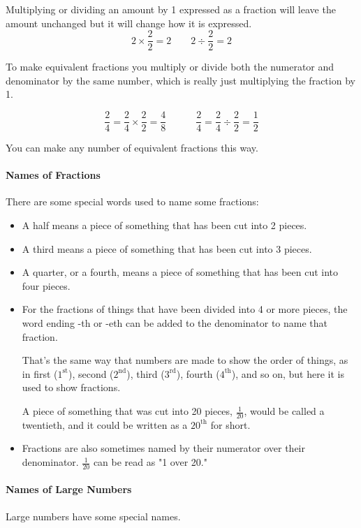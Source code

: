 \documentclass[12pt]{article}
\begin{document}
{Multiplying or dividing an amount by 1 expressed as a fraction will leave the amount unchanged but it will change how it is expressed.
$$2\times\frac{2}{2}=2 \hspace{2em} 2\div\frac{2}{2}=2$$
 
To make equivalent fractions you multiply or divide both the numerator and denominator by the same number, which is really just multiplying the fraction by 1.

$$\frac{2}{4} = \frac{2}{4}\times\frac{2}{2} = \frac{4}{8} \hspace{3em} \frac{2}{4} = \frac{2}{4}\div\frac{2}{2} = \frac{1}{2}$$

You can make any number of equivalent fractions this way.\\

\paragraph{Names of Fractions}
There are some special words used to name some fractions:

\begin{itemize}
\item A half means a piece of something that has been cut into 2 pieces.
\item A third means a piece of something that has been cut into 3 pieces.
\item A quarter, or a fourth, means a piece of something that has been cut into four pieces.
\item For the fractions of things that have been divided into 4 or more pieces, the word ending -th or -eth can be added to the denominator to name that fraction.

That's the same way that numbers are made to show the order of things, as in first ($1^{\textrm{st}}$), second ($2^{\textrm{nd}}$), third ($3^{\textrm{rd}}$), fourth ($4^{\textrm{th}}$), and so on, but here it is used to show fractions.

A piece of something that was cut into 20 pieces, $\frac{1}{20}$, would be called a twentieth, and it could be written as a $20^{\textrm{th}}$ for short.
\item Fractions are also sometimes named by their numerator over their denominator. $\frac{1}{20}$ can be read as  "1 over 20."
\end{itemize}

\paragraph{Names of Large Numbers}
Large numbers have some special names.

}
\end{document}
